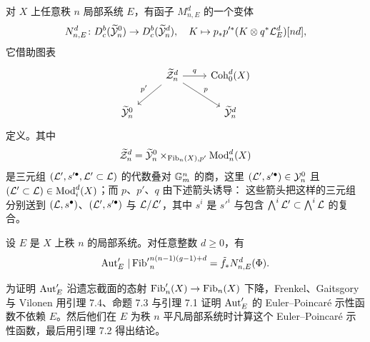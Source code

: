 对 $X$ 上任意秩 $n$ 局部系统 $E$，有函子 $M^d_{n,E}$ 的一个变体
\[
  N^d_{n,E} \colon D^{b}_{c}(\widetilde{\mathcal{Y}}^0_n) \to D^{b}_{c}(\widetilde{\mathcal{Y}}^d_n),
  \quad K \mapsto p_*p'^*(K \otimes q^*\mathcal{L}^d_E)[nd],
\]
它借助图表
\[
\begin{tikzcd}
 & \widetilde{\cZ}^d_n \arrow[dl, "p'"'] \arrow[dr, "p"] \arrow[r, "q"]
 & \Coh^d_0(X) \\
 \widetilde{\cY}^0_n & & \widetilde{\cY}^d_n
\end{tikzcd}
\]
定义。其中
\[
  \widetilde{\mathcal{Z}}^d_n = \widetilde{\mathcal{Y}}^0_n
  \times_{\operatorname{Fib}_n(X),p'} \operatorname{Mod}^d_n(X)
\]
是三元组 $(\mathcal{L}', s'^\bullet, \mathcal{L}' \subset \mathcal{L})$ 的代数叠对
$\mathbb{G}_m^n$ 的商，这里 $(\mathcal{L}', s'^\bullet) \in \mathcal{Y}^0_n$ 且
$(\mathcal{L}' \subset \mathcal{L}) \in \operatorname{Mod}^d_i(X)$；而 $p$、$p'$、$q$ 由下述箭头诱导：
这些箭头把这样的三元组分别送到 $(\mathcal{L}, s^\bullet)$、$(\mathcal{L}', s'^\bullet)$ 与
$\mathcal{L}/\mathcal{L}'$，其中 $s^i$ 是 $s'^i$ 与包含
$\bigwedge^i \mathcal{L}' \subset \bigwedge^i \mathcal{L}$ 的复合。

\begin{lemma}
设 $E$ 是 $X$ 上秩 $n$ 的局部系统。对任意整数 $d \ge 0$，有
\[
  \operatorname{Aut}'_E\,|\,{\operatorname{Fib}'}^{n(n-1)(g-1)+d}_n = \tilde{f}_*N^d_{n,E}(\Phi).
\]
\end{lemma}

为证明 $\operatorname{Aut}'_E$ 沿遗忘截面的态射 $\operatorname{Fib}'_n(X) \to \operatorname{Fib}_n(X)$ 下降，Frenkel、Gaitsgory
与 Vilonen 用引理 7.4、命题 7.3 与引理 7.1 证明 $\operatorname{Aut}'_E$ 的
Euler--Poincar\'e 示性函数不依赖 $E$。然后他们在 $E$ 为秩 $n$ 平凡局部系统时计算这个
Euler--Poincar\'e 示性函数，最后用引理 7.2 得出结论。
